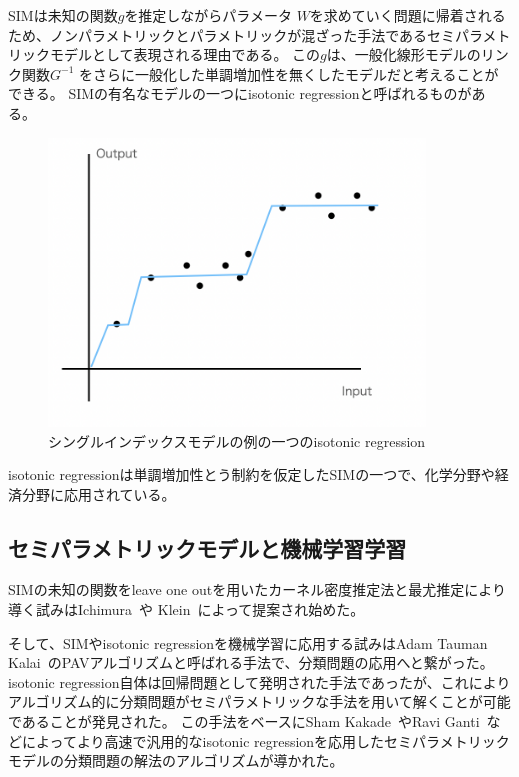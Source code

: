 SIMは未知の関数$ g $を推定しながらパラメータ $ W $を求めていく問題に帰着されるため、ノンパラメトリックとパラメトリックが混ざった手法であるセミパラメトリックモデルとして表現される理由である。
この$ g $は、一般化線形モデルのリンク関数$ G^{-1} $ をさらに一般化した単調増加性を無くしたモデルだと考えることができる。
SIMの有名なモデルの一つにisotonic regressionと呼ばれるものがある。

\begin{figure}[hbtp]

    \begin{center}
        \includegraphics[width=10cm]{asset/isotonic_regression.png}
            \caption{シングルインデックスモデルの例の一つのisotonic regression}
            \label{isotonic_regression}
    \end{center}
\end{figure}

isotonic regressionは単調増加性とう制約を仮定したSIMの一つで、化学分野や経済分野に応用されている。


\subsection {セミパラメトリックモデルと機械学習学習}

SIMの未知の関数をleave one outを用いたカーネル密度推定法と最尤推定により導く試みはIchimura~\cite{ichimura}や Klein~\cite{klein}によって提案され始めた。

そして、SIMやisotonic regressionを機械学習に応用する試みはAdam Tauman Kalai~\cite{isotron}のPAVアルゴリズムと呼ばれる手法で、分類問題の応用へと繋がった。
isotonic regression自体は回帰問題として発明された手法であったが、これによりアルゴリズム的に分類問題がセミパラメトリックな手法を用いて解くことが可能であることが発見された。
この手法をベースにSham Kakade~\cite{efficient_sim}やRavi Ganti~\cite{lsim}などによってより高速で汎用的なisotonic regressionを応用したセミパラメトリックモデルの分類問題の解法のアルゴリズムが導かれた。


